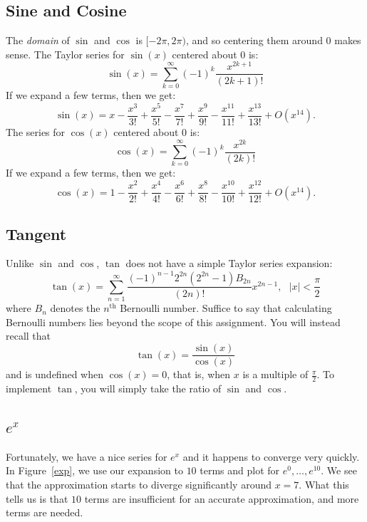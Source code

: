 \documentclass[11pt]{article}
\newcommand{\mlterm}[1]{\frac{x^{#1}}{#1!}}
\begin{document}
\subsection{Sine and Cosine}

The \emph{domain} of $\sin$ and $\cos$ is $[-2\pi, 2\pi)$, and so centering them
around $0$ makes sense. The Taylor series for $\sin(x)$ centered about $0$ is:
\[
\sin(x)= \sum_{k=0}^{\infty} (-1)^k \frac{x^{2k + 1}}{(2k +1)!}
\]
If we expand a few terms, then we get:
\[
  \sin(x) = x - \mlterm{3} + \mlterm{5} - \mlterm{7} + \mlterm{9} - \mlterm{11}
              + \mlterm{13} + O(x^{14}).
\]
The series for $\cos(x)$ centered about $0$ is:
\[
\cos(x)= \sum_{k=0}^{\infty} (-1)^k \frac{x^{2k}}{(2k)!}
\]
If we expand a few terms, then we get:
\[
  \cos(x) = 1 - \mlterm{2} + \mlterm{4} - \mlterm{6} + \mlterm{8} - \mlterm{10}
              + \mlterm{12} + O(x^{14}).
\]


\subsection{Tangent}

Unlike $\sin$ and $\cos$, $\tan$ does not have a simple Taylor series
expansion:
\[
  \tan(x) = \sum_{n=1}^{\infty}
  \frac{{(-1)}^{n-1}2^{2n}(2^{2n}-1)B_{2n}}{(2n)!}x^{2n-1},\ \ \ |x| < \frac{\pi}{2}
\]
where $B_n$ denotes the $n^{\text{th}}$ Bernoulli number. Suffice to say that
calculating Bernoulli numbers lies beyond the scope of this assignment.
You will instead recall that
\[
  \tan(x) = \frac{\sin(x)}{\cos(x)}
\]
and is undefined when $\cos(x) = 0$, that is, when $x$ is a
multiple of $\frac{\pi}{2}$. To implement $\tan$, you will simply take the ratio
of $\sin$ and $\cos$.


\subsection{\Large $e^x$}

Fortunately, we have a nice series for $e^x$ and it happens to converge very
quickly. In Figure~\ref{exp}, we use our expansion to $10$ terms and plot for
$e^0,\ldots,e^{10}$. We see that the approximation starts to diverge
significantly around $x = 7$. What this tells us is that $10$ terms are insufficient
for an accurate approximation, and more terms are needed.
\end{document}
